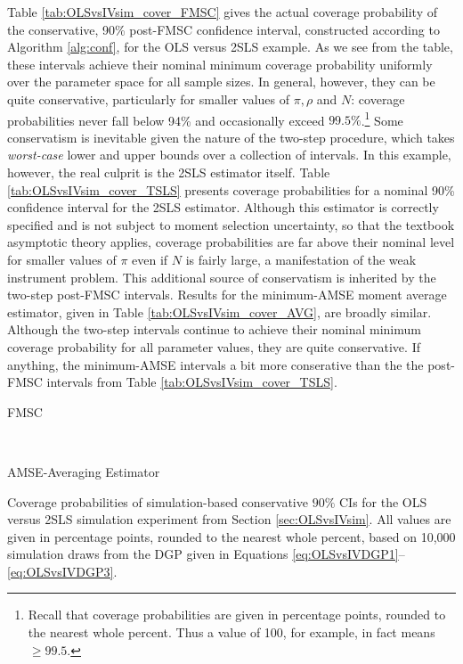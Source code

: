 Table \ref{tab:OLSvsIVsim_cover_FMSC} gives the actual coverage probability of the conservative, 90\% post-FMSC confidence interval, constructed according to Algorithm \ref{alg:conf}, for the OLS versus 2SLS example.
As we see from the table, these intervals achieve their nominal minimum coverage probability uniformly over the parameter space for all sample sizes.
In general, however, they can be quite conservative, particularly for smaller values of $\pi, \rho$ and $N$: coverage probabilities never fall below 94\% and occasionally exceed $99.5\%$.\footnote{Recall that coverage probabilities are given in percentage points, rounded to the nearest whole percent. Thus a value of 100, for example, in fact means $\geq 99.5$.}
Some conservatism is inevitable given the nature of the two-step procedure, which takes \emph{worst-case} lower and upper bounds over a collection of intervals.
In this example, however, the real culprit is the 2SLS estimator itself.
Table \ref{tab:OLSvsIVsim_cover_TSLS} presents coverage probabilities for a nominal 90\% confidence interval for the 2SLS estimator.
Although this estimator is correctly specified and is not subject to moment selection uncertainty, so that the textbook asymptotic theory applies, coverage probabilities are far above their nominal level for smaller values of $\pi$ even if $N$ is fairly large, a manifestation of the weak instrument problem.
This additional source of conservatism is inherited by the two-step post-FMSC intervals.
Results for the minimum-AMSE moment average estimator, given in Table \ref{tab:OLSvsIVsim_cover_AVG}, are broadly similar.
Although the two-step intervals continue to achieve their nominal minimum coverage probability for all parameter values, they are quite conservative.
If anything, the minimum-AMSE intervals a bit more conserative than the the post-FMSC intervals from Table \ref{tab:OLSvsIVsim_cover_TSLS}.

\begin{table}[h]
\footnotesize
\centering
	\begin{subtable}{0.48\textwidth}
		\caption{FMSC}
		
		\label{tab:OLSvsIVsim_cover_FMSC}
	\end{subtable}	
	~
	\begin{subtable}{0.48\textwidth}
		\caption{AMSE-Averaging Estimator}
		
		\label{tab:OLSvsIVsim_cover_AVG}
	\end{subtable}
	\caption{Coverage probabilities of simulation-based conservative $90\%$ CIs for the OLS versus 2SLS simulation experiment from Section \ref{sec:OLSvsIVsim}. All values are given in percentage points, rounded to the nearest whole percent, based on 10,000 simulation draws from the DGP given in Equations \ref{eq:OLSvsIVDGP1}--\ref{eq:OLSvsIVDGP3}.}
\end{table}

